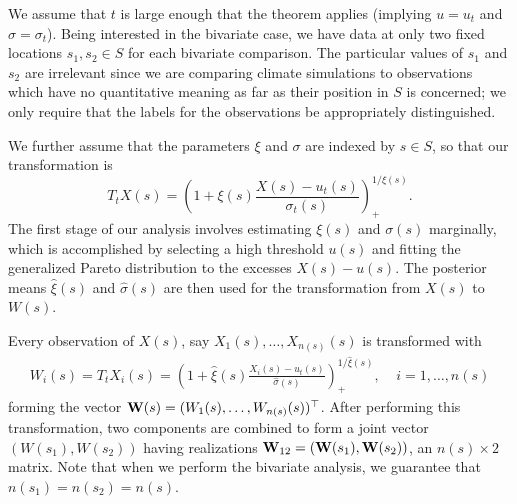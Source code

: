 We assume that $t$ is large enough that the theorem applies (implying $u=u_t$ and $\sigma=\sigma_t$). Being interested in the bivariate case, we have data at only two fixed locations $s_1,s_2\in S$ for each bivariate comparison. The particular values of $s_1$ and $s_2$ are irrelevant since we are comparing climate simulations to observations which have no quantitative meaning as far as their position in $S$ is concerned; we only require that the labels for the observations be appropriately distinguished.

We further assume that the parameters $\xi$ and $\sigma$ are indexed by $s\in S$, so that our transformation is
\[ T_t X(s) = \left(1 + \xi(s) \frac{X(s) - u_t(s)}{\sigma_t(s)}\right)_+^{1/\xi(s)}. \]
The first stage of our analysis involves estimating $\xi(s)$ and $\sigma(s)$ marginally, which is accomplished by selecting a high threshold $u(s)$ and fitting the generalized Pareto distribution to the excesses $X(s)-u(s)$. The posterior means $\hat{\xi}(s)$ and $\hat{\sigma}(s)$ are then used for the transformation from $X(s)$ to $W(s)$.

Every observation of $X(s)$, say $X_1(s),\ldots,X_{n(s)}(s)$ is transformed with
\begin{align}
W_i(s) = T_t X_i(s) = \left(1 + \hat{\xi}(s) \frac{X_i(s) - u_t(s)}{\hat{\sigma}(s)}\right)_+^{1/\hat{\xi}(s)},~~~~~i=1,\ldots,n(s) \label{transform}
\end{align}
forming the vector $\mathbf{\bm{W}}(s)=(W_1(s),\ldots,W_{n(s)}(s))^\top$. After performing this transformation, two components are combined to form a joint vector $(W(s_1), W(s_2))$ having realizations $\mathbf{\bm{W}}_{12}=(\mathbf{\bm{W}}(s_1), \mathbf{\bm{W}}(s_2))$, an $n(s)\times 2$ matrix. Note that when we perform the bivariate analysis, we guarantee that $n(s_1)=n(s_2)=n(s)$.

